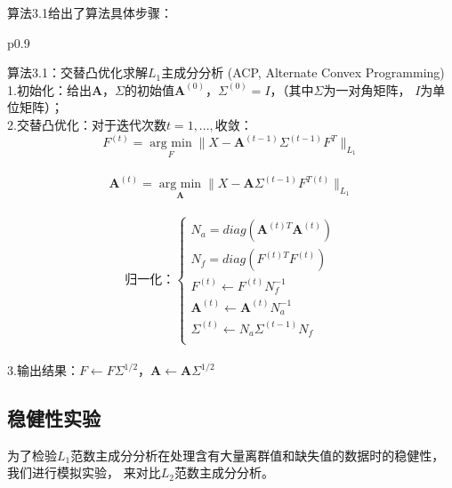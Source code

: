 算法3.1给出了算法具体步骤：

\begin{table}[H]%
    \centering%
    \begin{tabular}{{p{0.9\columnwidth}}}%
    
    \toprule%
    算法3.1：交替凸优化求解$L_1$主成分分析 (ACP, Alternate Convex Programming) \\
    \midrule%
    1.初始化：给出$\bm{A}$，$\Sigma$的初始值$\bm{A}^{(0)}$，$\Sigma^{(0)} = I$，（其中$\Sigma$为一对角矩阵，
    $I$为单位矩阵）； \\

    2.交替凸优化：对于迭代次数$t = 1, ..., $收敛： \\
    $$F^{(t)} = \underset{F}{\operatorname{arg\ min}} \|X - \bm{A}^{(t-1)}\Sigma^{(t-1)}F^{T}\|_{L_1}$$ \\
    $$\bm{A}^{(t)} = \underset{\bm{A}}{\operatorname{arg\ min}} \|X - \bm{A}\Sigma^{(t-1)}F^{T(t)} \|_{L_1}$$ \\
    \begin{equation*}
        \text{归一化：}\left\{
                    \begin{array}{clr}
                    N_a = diag(\bm{A}^{(t)T}\bm{A}^{(t)})\\
                    N_f = diag(F^{(t)T}F^{(t)})\\
                    F^{(t)} \leftarrow F^{(t)}N_f^{-1}\\
                    \bm{A}^{(t)}\leftarrow \bm{A}^{(t)}N_a^{-1}\\
                    \Sigma^{(t)} \leftarrow N_a\Sigma^{(t-1)}N_f\\
                    \end{array}
        \right.
    \end{equation*} \\

    3.输出结果：$F \leftarrow F\Sigma^{1/2}$，$\bm{A} \leftarrow \bm{A}\Sigma^{1/2}$ \\
    \bottomrule%
    \end{tabular}
\end{table}%

\subsection{稳健性实验}
为了检验$L_1$范数主成分分析在处理含有大量离群值和缺失值的数据时的稳健性，我们进行模拟实验，
来对比$L_2$范数主成分分析。

